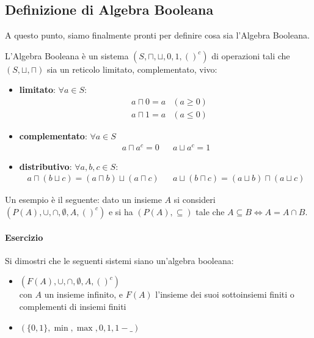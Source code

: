 \subsection{Definizione di Algebra Booleana}
A questo punto, siamo finalmente pronti per definire cosa sia l'Algebra Booleana.
\begin{defi}
L'Algebra Booleana è un sistema $(S, \sqcap, \sqcup, 0, 1, ()^c)$ di operazioni tali che $(S,\sqcup,\sqcap)$ sia un reticolo limitato, complementato, vivo:
\begin{itemize}
  \item \textbf{limitato}: $\forall a \in S$:
    \begin{align*}
      & a \sqcap 0 = a & (a \geq 0) \\
      & a \sqcap 1 = a & (a \leq 0)
    \end{align*}
  \item \textbf{complementato}: $\forall a \in S$
    \begin{align*}
      a \sqcap a^c = 0 && a \sqcup a^c = 1
    \end{align*}
  \item \textbf{distributivo}: $\forall a,b, c \in S$:
    \begin{align*}
      a \sqcap (b \sqcup c) = (a \sqcap b) \sqcup (a \sqcap c) && a \sqcup (b \sqcap c) = (a \sqcup b) \sqcap ( a \sqcup c)
    \end{align*}
\end{itemize}
\end{defi}

Un esempio è il seguente: dato un insieme $A$ si consideri 
$(P(A), \cup, \cap, \emptyset, A, ()^c)$ e si ha 
$(P(A), \subseteq)$ tale che $A \subseteq B \iff A = A \cap B$. 

\paragraph{Esercizio}
Si dimostri che le seguenti sistemi siano un'algebra booleana:
\begin{itemize}
  \item $(F(A), \cup, \cap, \emptyset, A, ()^c)$ \\
    con $A$ un insieme infinito, e $F(A)$ l'insieme dei suoi sottoinsiemi finiti o complementi di insiemi finiti
  \item $(\{0,1\}, \min, \max, 0, 1, 1-\_)$
\end{itemize}

